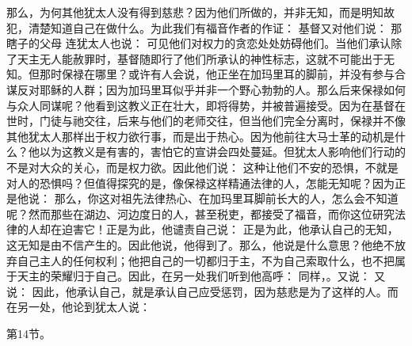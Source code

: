 那么，为何其他犹太人没有得到慈悲？因为他们所做的，并非无知，而是明知故犯，清楚知道自己在做什么。为此我们有福音作者的作证： 基督又对他们说： 那瞎子的父母 连犹太人也说： 可见他们对权力的贪恋处处妨碍他们。当他们承认除了天主无人能赦罪时，基督随即行了他们所承认的神性标志，这就不可能出于无知。但那时保禄在哪里？或许有人会说，他正坐在加玛里耳的脚前，并没有参与合谋反对耶稣的人群；因为加玛里耳似乎并非一个野心勃勃的人。那么后来保禄如何与众人同谋呢？他看到这教义正在壮大，即将得势，并被普遍接受。因为在基督在世时，门徒与祂交往，后来与他们的老师交往，但当他们完全分离时，保禄并不像其他犹太人那样出于权力欲行事，而是出于热心。因为他前往大马士革的动机是什么？他以为这教义是有害的，害怕它的宣讲会四处蔓延。但犹太人影响他们行动的不是对大众的关心，而是权力欲。因此他们说： 这种让他们不安的恐惧，不就是对人的恐惧吗？但值得探究的是，像保禄这样精通法律的人，怎能无知呢？因为正是他说： 那么，你这对祖先法律热心、在加玛里耳脚前长大的人，怎么会不知道呢？然而那些在湖边、河边度日的人，甚至税吏，都接受了福音，而你这位研究法律的人却在迫害它！正是为此，他谴责自己说： 正是为此，他承认自己的无知，这无知是由不信产生的。因此他说，他得到了。那么，他说是什么意思？他绝不放弃自己主人的任何权利；他把自己的一切都归于主，不为自己索取什么，也不把属于天主的荣耀归于自己。因此，在另一处我们听到他高呼： 同样，。又说： 又说： 因此，他承认自己，就是承认自己应受惩罚，因为慈悲是为了这样的人。而在另一处，他论到犹太人说：\par

第14节。\par

